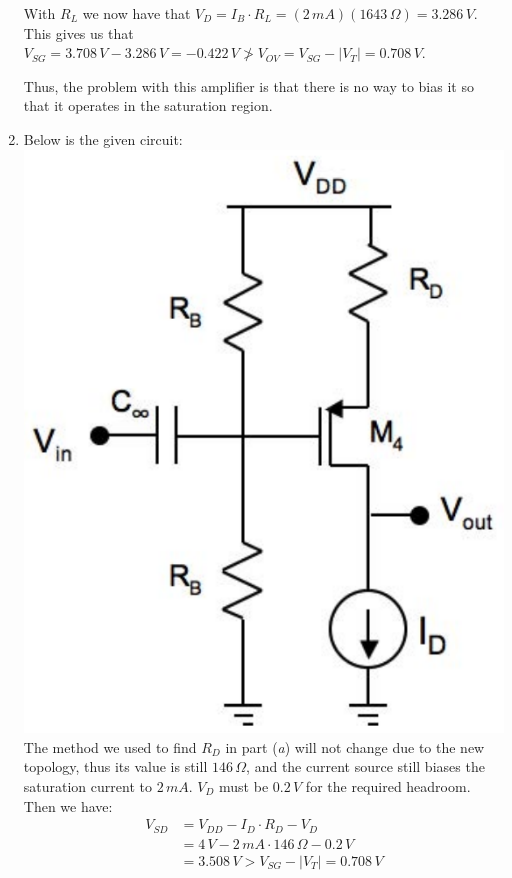 \documentclass[12pt, fleqn]{article}
\begin{document}
\begin{enumerate}[label=(\alph*)]
    With $R_L$ we now have that $V_D = I_B \cdot R_L = (2\,mA)(1643\,\Omega) = 3.286\,V$.  This gives us that $V_{SG} = 3.708\,V - 3.286\,V = -0.422\,V \not> V_{OV} = V_{SG} - \left|V_T\right| = 0.708\,V$.
    
    \vspace{0.5cm}
    Thus, the problem with this amplifier is that there is no way to bias it so that it operates in the saturation region.
    \newpage\noindent
    \item
    {
    Below is the given circuit:\\
    \includegraphics[scale=0.35, center]{p1b.png}\\
    }
    The method we used to find $R_D$ in part (\textit{a}) will not change due to the new topology, thus its value is still $146\,\Omega$, and the current source still biases the saturation current to $2\,mA$.  $V_D$ must be $0.2\,V$ for the required headroom.  Then we have:
    \begin{align*}
        V_{SD} &= V_{DD} - I_D \cdot R_D - V_D\\[0.25cm]
        &= 4\,V -2\,mA \cdot 146\,\Omega - 0.2\,V\\[0.25cm]
        &= 3.508\,V > V_{SG} - \left|V_T\right| = 0.708\,V
    \end{align*}


\end{enumerate}
\end{document}
